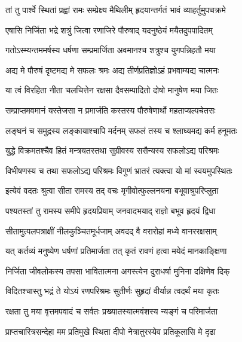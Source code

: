 
\twolineshloka
{तां तु पार्श्वे स्थितां प्रह्वां रामः सम्प्रेक्ष्य मैथिलीम्}
{हृदयान्तर्गतं भावं व्याहर्तुमुपचक्रमे} %

\twolineshloka
{एषासि निर्जिता भद्रे शत्रुं जित्वा रणाजिरे}
{पौरुषाद् यदनुष्ठेयं मयैतदुपपादितम्} %

\twolineshloka
{गतोऽस्म्यन्तममर्षस्य धर्षणा सम्प्रमार्जिता}
{अवमानश्च शत्रुश्च युगपन्निहतौ मया} %

\twolineshloka
{अद्य मे पौरुषं दृष्टमद्य मे सफलः श्रमः}
{अद्य तीर्णप्रतिज्ञोऽहं प्रभवाम्यद्य चात्मनः} %

\twolineshloka
{या त्वं विरहिता नीता चलचित्तेन रक्षसा}
{दैवसम्पादितो दोषो मानुषेण मया जितः} %

\twolineshloka
{सम्प्राप्तमवमानं यस्तेजसा न प्रमार्जति}
{कस्तस्य पौरुषेणार्थो महताप्यल्पचेतसः} %

\twolineshloka
{लङ्घनं च समुद्रस्य लङ्कायाश्चापि मर्दनम्}
{सफलं तस्य च श्लाघ्यमद्य कर्म हनूमतः} %

\twolineshloka
{युद्धे विक्रमतश्चैव हितं मन्त्रयतस्तथा}
{सुग्रीवस्य ससैन्यस्य सफलोऽद्य परिश्रमः} %

\twolineshloka
{विभीषणस्य च तथा सफलोऽद्य परिश्रमः}
{विगुणं भ्रातरं त्यक्त्वा यो मां स्वयमुपस्थितः} %

\twolineshloka
{इत्येवं वदतः श्रुत्वा सीता रामस्य तद् वचः}
{मृगीवोत्फुल्लनयना बभूवाश्रुपरिप्लुता} %

\twolineshloka
{पश्यतस्तां तु रामस्य समीपे हृदयप्रियाम्}
{जनवादभयाद् राज्ञो बभूव हृदयं द्विधा} %

\twolineshloka
{सीतामुत्पलपत्राक्षीं नीलकुञ्चितमूर्धजाम्}
{अवदद् वै वरारोहां मध्ये वानररक्षसाम्} %

\twolineshloka
{यत् कर्तव्यं मनुष्येण धर्षणां प्रतिमार्जता}
{तत् कृतं रावणं हत्वा मयेदं मानकाङ्क्षिणा} %

\twolineshloka
{निर्जिता जीवलोकस्य तपसा भावितात्मना}
{अगस्त्येन दुराधर्षा मुनिना दक्षिणेव दिक्} %

\twolineshloka
{विदितश्चास्तु भद्रं ते योऽयं रणपरिश्रमः}
{सुतीर्णः सुहृदां वीर्यान्न त्वदर्थं मया कृतः} %

\twolineshloka
{रक्षता तु मया वृत्तमपवादं च सर्वतः}
{प्रख्यातस्यात्मवंशस्य न्यङ्गं च परिमार्जता} %

\twolineshloka
{प्राप्तचारित्रसन्देहा मम प्रतिमुखे स्थिता}
{दीपो नेत्रातुरस्येव प्रतिकूलासि मे दृढा} %

